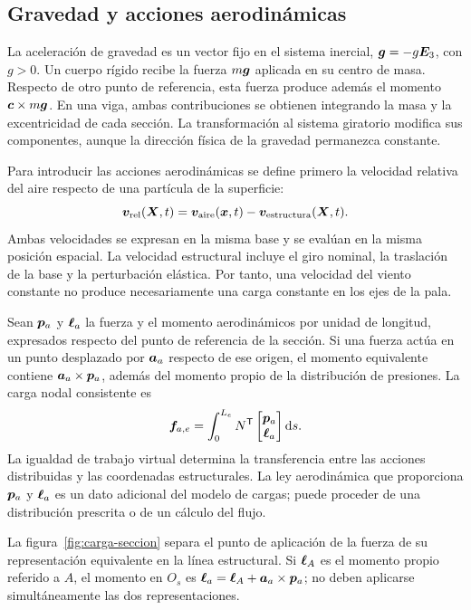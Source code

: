 \subsection{Gravedad y acciones aerodinámicas}
La aceleración de gravedad es un vector fijo en el sistema inercial,
$\bm{g}=-g\bm{E}_3$, con $g>0$. Un cuerpo rígido recibe la fuerza $m\bm{g}$ aplicada en su centro de masa. Respecto de otro punto de referencia, esta fuerza produce además el momento $\bm{c}\times m\bm{g}$. En una viga, ambas contribuciones se obtienen integrando la masa y la excentricidad de cada sección. La transformación al sistema giratorio modifica sus componentes, aunque la dirección física de la gravedad permanezca constante.

Para introducir las acciones aerodinámicas se define primero la velocidad relativa del aire respecto de una partícula de la superficie:
\begin{equation}
 \bm{v}_{\mathrm{rel}}(\bm{X},t)
 =\bm{v}_{\mathrm{aire}}(\bm{x},t)-\bm{v}_{\mathrm{estructura}}(\bm{X},t).
 \label{eq:velocidad-relativa-aire}
\end{equation}
Ambas velocidades se expresan en la misma base y se evalúan en la misma posición espacial. La velocidad estructural incluye el giro nominal, la traslación de la base y la perturbación elástica. Por tanto, una velocidad del viento constante no produce necesariamente una carga constante en los ejes de la pala.

Sean $\bm{p}_a$ y $\bm{\ell}_a$ la fuerza y el momento aerodinámicos por unidad de longitud, expresados respecto del punto de referencia de la sección. Si una fuerza actúa en un punto desplazado por $\bm{a}_a$ respecto de ese origen, el momento equivalente contiene $\bm{a}_a\times\bm{p}_a$, además del momento propio de la distribución de presiones. La carga nodal consistente es
\begin{equation}
 \bm{f}_{a,e}
 =\int_0^{L_e}N^\mathsf T
 \begin{bmatrix}\bm{p}_a\\\bm{\ell}_a\end{bmatrix}\mathrm d s.
 \label{eq:viento-consistente}
\end{equation}
La igualdad de trabajo virtual determina la transferencia entre las acciones distribuidas y las coordenadas estructurales. La ley aerodinámica que proporciona $\bm{p}_a$ y $\bm{\ell}_a$ es un dato adicional del modelo de cargas; puede proceder de una distribución prescrita o de un cálculo del flujo.

La figura~\ref{fig:carga-seccion} separa el punto de aplicación de la fuerza de su representación equivalente en la línea estructural. Si $\bm{\ell}_A$ es el momento propio referido a $A$, el momento en $O_s$ es $\bm{\ell}_a=\bm{\ell}_A+\bm{a}_a\times\bm{p}_a$; no deben aplicarse simultáneamente las dos representaciones.

